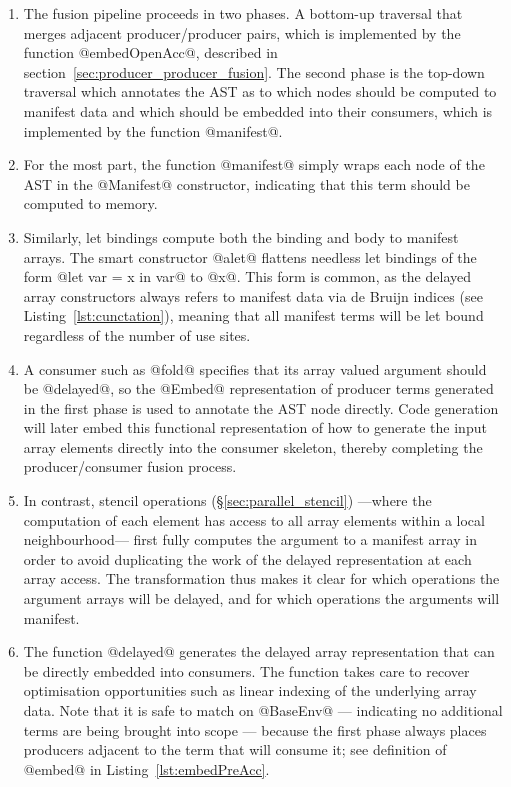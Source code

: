 \begin{enumerate}
\item The fusion pipeline proceeds in two phases. A bottom-up traversal that
    merges adjacent producer/producer pairs, which is implemented by the
    function @embedOpenAcc@, described in
    section~\ref{sec:producer_producer_fusion}. The second phase is the top-down
    traversal which annotates the AST as to which nodes should be computed to
    manifest data and which should be embedded into their consumers, which is
    implemented by the function @manifest@.

\item For the most part, the function @manifest@ simply wraps each node of the
    AST in the @Manifest@ constructor, indicating that this term should be
    computed to memory.

\item Similarly, let bindings compute both the binding and body to manifest
    arrays. The smart constructor @alet@ flattens needless let bindings of the
    form @let var = x in var@ to @x@. This form is common, as the delayed array
    constructors always refers to manifest data via de Bruijn indices (see
    Listing~\ref{lst:cunctation}), meaning that all manifest terms will be let
    bound regardless of the number of use sites.

\item A consumer such as @fold@ specifies that its array valued argument should
    be @delayed@, so the @Embed@ representation of producer terms generated in
    the first phase is used to annotate the AST node directly. Code generation
    will later embed this functional representation of how to generate the input
    array elements directly into the consumer skeleton, thereby completing the
    producer/consumer fusion process.

\item In contrast, stencil operations (\S\ref{sec:parallel_stencil}) ---where
    the computation of each element has access to all array elements within a
    local neighbourhood--- first fully computes the argument to a manifest array
    in order to avoid duplicating the work of the delayed representation at each
    array access. The transformation thus makes it clear for which operations
    the argument arrays will be delayed, and for which operations the arguments
    will manifest.

\item The function @delayed@ generates the delayed array representation that can
    be directly embedded into consumers. The function takes care to recover
    optimisation opportunities such as linear indexing of the underlying array
    data. Note that it is safe to match on @BaseEnv@ --- indicating no
    additional terms are being brought into scope --- because the first phase
    always places producers adjacent to the term that will consume it; see
    definition of @embed@ in Listing~\ref{lst:embedPreAcc}.

\end{enumerate}


